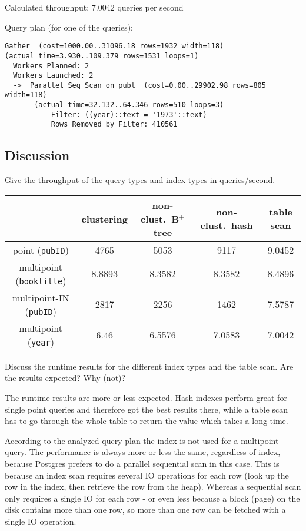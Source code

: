 \documentclass[11pt]{scrartcl}
\begin{document}
Calculated throughput: 7.0042 queries per second

Query plan (for one of the queries):

{\small
\parskip0pt\begin{verbatim}
Gather  (cost=1000.00..31096.18 rows=1932 width=118) 
(actual time=3.930..109.379 rows=1531 loops=1)
  Workers Planned: 2
  Workers Launched: 2
  ->  Parallel Seq Scan on publ  (cost=0.00..29902.98 rows=805 width=118) 
       (actual time=32.132..64.346 rows=510 loops=3)
           Filter: ((year)::text = '1973'::text)
           Rows Removed by Filter: 410561
\end{verbatim}}

\subsection*{Discussion}

Give the throughput of the query types and index types in queries/second.
\begin{table}[H]
  \centering
  \begin{tabular}{c|c|c|c|c}
    & clustering & non-clust.\ B$^+$ tree & non-clust.\ hash & table scan
      \tabularnewline
    \hline
    point (\texttt{pubID}) & 4765 & 5053 & 9117 & 9.0452 \tabularnewline
    \hline
    multipoint (\texttt{booktitle}) & 8.8893 & 8.3582 & 8.3582 & 8.4896
      \tabularnewline
    \hline
		multipoint-IN (\texttt{pubID}) & 2817 & 2256 & 1462 & 7.5787
      \tabularnewline
		\hline
    multipoint (\texttt{year}) & 6.46 & 6.5576 & 7.0583 & 7.0042
      \tabularnewline
  \end{tabular}
\end{table}

Discuss the runtime results for the different index types and the table scan. Are the results expected? Why (not)?

The runtime results are more or less expected. Hash indexes perform great for single point queries and therefore got the best results there, while a table scan has to go through the whole table to return the value which takes a long time.

According to the analyzed query plan the index is not used for a multipoint query. The performance is always more or less the same, regardless of index, because Postgres prefers to do a parallel sequential scan in this case. This is because an index scan requires several IO operations for each row (look up the row in the 	index, then retrieve the row from the heap). Whereas a sequential scan only requires a single IO for each row - or even less because a block (page) on the disk contains more than one row, so more than one row can be fetched with a single IO operation.
\end{document}
